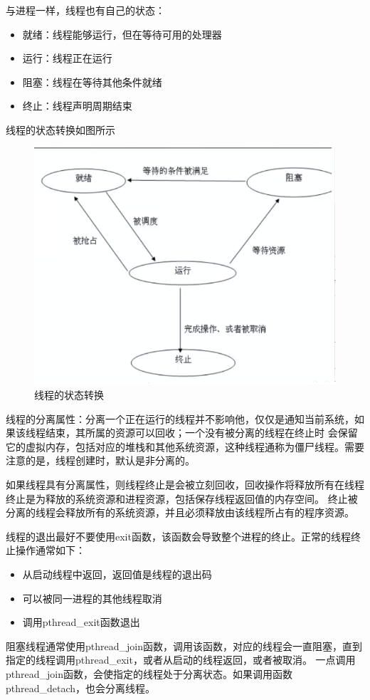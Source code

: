 与进程一样，线程也有自己的状态：
\begin{itemize}
  \item 就绪：线程能够运行，但在等待可用的处理器
  \item 运行：线程正在运行
  \item 阻塞：线程在等待其他条件就绪
  \item 终止：线程声明周期结束
\end{itemize}
线程的状态转换如图所示
\begin{figure}[H]
  \centering
  \includegraphics[scale=1]{status_of_thread.png}
  \caption{线程的状态转换}
  \label{fig:status_of_thread}
\end{figure}

线程的分离属性：分离一个正在运行的线程并不影响他，仅仅是通知当前系统，如果该线程结束，其所属的资源可以回收；一个没有被分离的线程在终止时
会保留它的虚拟内存，包括对应的堆栈和其他系统资源，这种线程通称为僵尸线程。需要注意的是，线程创建时，默认是非分离的。

如果线程具有分离属性，则线程终止是会被立刻回收，回收操作将释放所有在线程终止是为释放的系统资源和进程资源，包括保存线程返回值的内存空间。
终止被分离的线程会释放所有的系统资源，并且必须释放由该线程所占有的程序资源。

线程的退出最好不要使用exit函数，该函数会导致整个进程的终止。正常的线程终止操作通常如下：
\begin{itemize}
  \item 从启动线程中返回，返回值是线程的退出码
  \item 可以被同一进程的其他线程取消
  \item 调用pthread\_exit函数退出
\end{itemize}

阻塞线程通常使用pthread\_join函数，调用该函数，对应的线程会一直阻塞，直到指定的线程调用pthread\_exit，或者从启动的线程返回，或者被取消。
一点调用pthread\_join函数，会使指定的线程处于分离状态。如果调用函数pthread\_detach，也会分离线程。
